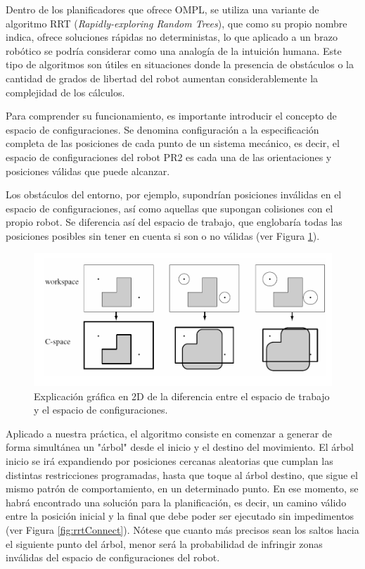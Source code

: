 \documentclass[12pt,spanish,chapterprefix, numbers=noenddot]{book}
\numberwithin{equation}{section}
\numberwithin{figure}{section}
\begin{document}
Dentro de los planificadores que ofrece OMPL, se utiliza una variante de algoritmo RRT (\textit{Rapidly-exploring Random Trees}), que como su propio nombre indica, ofrece soluciones rápidas no deterministas, lo que aplicado a un brazo robótico se podría considerar como una analogía de la intuición humana. Este tipo de algoritmos son útiles en situaciones donde la presencia de obstáculos o la cantidad de grados de libertad del robot aumentan considerablemente la complejidad de los cálculos.  

Para comprender su funcionamiento, es importante introducir el concepto de espacio de configuraciones. Se denomina configuración a la especificación completa de las posiciones de cada punto de un sistema mecánico, es decir, el espacio de configuraciones del robot PR2 es cada una de las orientaciones y posiciones válidas que puede alcanzar. 

Los obstáculos del entorno, por ejemplo, supondrían posiciones inválidas en el espacio de configuraciones, así como aquellas que supongan colisiones con el propio robot. Se diferencia así del espacio de trabajo, que englobaría todas las posiciones posibles sin tener en cuenta si son o no válidas (ver Figura \ref{fig:cspace}). 

\begin{figure}[hbt!]
\centering
\includegraphics[width=12cm]{Figs/cspace_vs_workspace.png}
\par
\caption{\label{fig:cspace}Explicación gráfica en 2D de la diferencia entre el espacio de trabajo y el espacio de configuraciones.}
\end{figure}

Aplicado a nuestra práctica, el algoritmo consiste en comenzar a generar de forma simultánea un "árbol"  desde el inicio y el destino del movimiento. El árbol inicio se irá expandiendo por posiciones cercanas aleatorias que cumplan las distintas restricciones programadas, hasta que toque al árbol destino, que sigue el mismo patrón de comportamiento, en un determinado punto. En ese momento, se habrá encontrado una solución para la planificación, es decir, un camino válido entre la posición inicial y la final que debe poder ser ejecutado sin impedimentos (ver Figura \ref{fig:rrtConnect}). Nótese que cuanto más precisos sean los saltos hacia el siguiente punto del árbol, menor será la probabilidad de infringir zonas inválidas del espacio de configuraciones del robot. 
\end{document}
